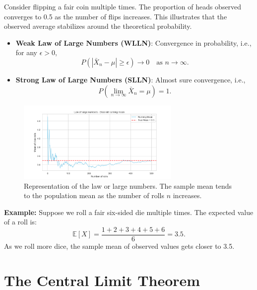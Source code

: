 \documentclass{book}
\begin{document}
Consider flipping a fair coin multiple times. The proportion of heads observed converges to 0.5 as the number of flips increases. This illustrates that the observed average stabilizes around the theoretical probability.

\begin{itemize}
    \item \textbf{Weak Law of Large Numbers (WLLN)}: Convergence in probability, i.e., for any $\epsilon > 0$, 
    \begin{equation}
        P(|\bar{X}_n - \mu| \geq \epsilon) \to 0 \quad \text{as } n \to \infty.
    \end{equation}
    \item \textbf{Strong Law of Large Numbers (SLLN)}: Almost sure convergence, i.e.,
    \begin{equation}
        P\left( \lim_{n \to \infty} \bar{X}_n = \mu \right) = 1.
    \end{equation}
\end{itemize}

\begin{figure}[ht]
    \centering
    \includegraphics[width=0.7\textwidth]{figures/chapter3/law_large_numbers.png}
    \caption{Representation of the law or large numbers. The sample mean tends to the population mean as the number of rolls $n$ increases.}
    \label{fig:random}
\end{figure}

\textbf{Example:} Suppose we roll a fair six-sided die multiple times. The expected value of a roll is:
\begin{equation}
    \mathbb{E}[X] = \frac{1+2+3+4+5+6}{6} = 3.5.
\end{equation}
As we roll more dice, the sample mean of observed values gets closer to 3.5.

\newpage

\section{The Central Limit Theorem}
\end{document}
